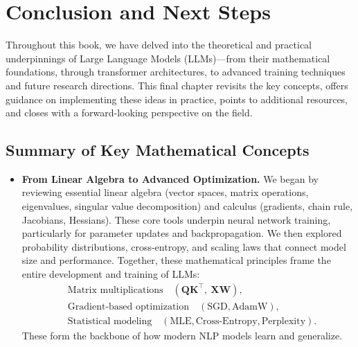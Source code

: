 \chapter{Conclusion and Next Steps}
\label{chap:conclusion_next_steps}

\noindent
Throughout this book, we have delved into the theoretical and practical underpinnings of Large Language Models (LLMs)—from their mathematical foundations, through transformer architectures, to advanced training techniques and future research directions. This final chapter revisits the key concepts, offers guidance on implementing these ideas in practice, points to additional resources, and closes with a forward-looking perspective on the field.

\section{Summary of Key Mathematical Concepts}
\label{sec:summary_math_concepts}
\begin{itemize}
    \item \textbf{From Linear Algebra to Advanced Optimization.}
    We began by reviewing essential linear algebra (vector spaces, matrix operations, eigenvalues, singular value decomposition) and calculus (gradients, chain rule, Jacobians, Hessians). These core tools underpin neural network training, particularly for parameter updates and backpropagation. We then explored probability distributions, cross-entropy, and scaling laws that connect model size and performance. Together, these mathematical principles frame the entire development and training of LLMs:
    \[
      \begin{aligned}
      &\text{Matrix multiplications} \quad(\mathbf{Q}\mathbf{K}^\top,\ \mathbf{X}\mathbf{W}),\\
      &\text{Gradient-based optimization} \quad(\text{SGD}, \text{AdamW}),\\
      &\text{Statistical modeling} \quad(\text{MLE}, \text{Cross-Entropy}, \text{Perplexity}).
      \end{aligned}
    \]
    These form the backbone of how modern NLP models learn and generalize.
\end{itemize}

